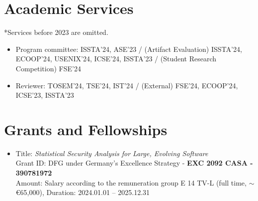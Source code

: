 \documentclass[letterpaper,10pt]{article}
\newcommand{\resumeSubHeadingListEnd}{\end{itemize}}
\begin{document}


\section{Academic Services}
*Services before 2023 are omitted.
\begin{itemize}
  \item Program committee: ISSTA'24, ASE'23 / (Artifact Evaluation) ISSTA'24, ECOOP'24, USENIX'24, ICSE'24, ISSTA'23 / (Student Research Competition) FSE'24
  \item Reviewer: TOSEM'24, TSE'24, IST'24 / (External) FSE'24, ECOOP'24, ICSE'23, ISSTA'23
\end{itemize}


\section{Grants and Fellowships}
\begin{itemize}
  \item Title: \emph{Statistical Security Analysis for Large, Evolving Software} \\ 
  Grant ID: DFG under Germany's Excellence Strategy - \textbf{EXC 2092 CASA - 390781972} \\ 
  Amount: Salary according to the remuneration group E 14 TV-L (full time, $\sim$ \euro{65,000}), Duration: 2024.01.01 -- 2025.12.31
\end{itemize}
\end{document}
